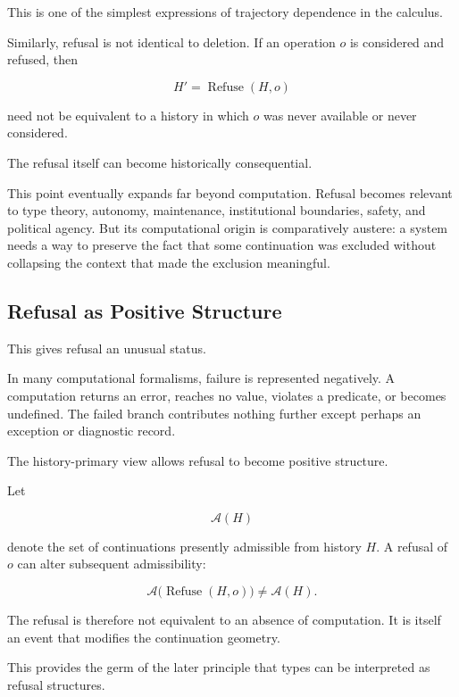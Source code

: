 \documentclass[11pt]{article}
\theoremstyle{remark}
\newcommand{\Adm}{\mathcal{A}}
\begin{document}
This is one of the simplest expressions of trajectory dependence in the calculus.

Similarly, refusal is not identical to deletion. If an operation $o$ is considered and refused, then

\begin{equation}
H'=\operatorname{Refuse}(H,o)
\end{equation}

need not be equivalent to a history in which $o$ was never available or never considered.

The refusal itself can become historically consequential.

This point eventually expands far beyond computation. Refusal becomes relevant to type theory, autonomy, maintenance, institutional boundaries, safety, and political agency. But its computational origin is comparatively austere: a system needs a way to preserve the fact that some continuation was excluded without collapsing the context that made the exclusion meaningful.

\subsection{Refusal as Positive Structure}

This gives refusal an unusual status.

In many computational formalisms, failure is represented negatively. A computation returns an error, reaches no value, violates a predicate, or becomes undefined. The failed branch contributes nothing further except perhaps an exception or diagnostic record.

The history-primary view allows refusal to become positive structure.

Let

\begin{equation}
\Adm(H)
\end{equation}

denote the set of continuations presently admissible from history $H$. A refusal of $o$ can alter subsequent admissibility:

\begin{equation}
\Adm\bigl(\operatorname{Refuse}(H,o)\bigr)
\neq
\Adm(H).
\end{equation}

The refusal is therefore not equivalent to an absence of computation. It is itself an event that modifies the continuation geometry.

This provides the germ of the later principle that types can be interpreted as refusal structures.
\end{document}
